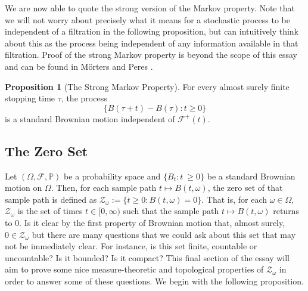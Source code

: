 \documentclass[a4paper,11pt]{article}
\theoremstyle{plain}
\theoremstyle{definition}
\newtheorem{definition}[theorem]{Definition}
\newtheorem{proposition}[theorem]{Proposition}
\begin{document}

We are now able to quote the strong version of the Markov property. Note that we will not worry about precisely what it means for a stochastic process to be independent of a filtration in the following proposition, but can intuitively think about this as the process being independent of any information available in that filtration. Proof of the strong Markov property is beyond the scope of this essay and can be found in M\"orters and Peres \citep[p.~43-44]{M&P}.

\begin{proposition}[The Strong Markov Property]\citep[p.~43]{M&P}
For every almost surely finite stopping time $\tau$, the process
\[
\{B(\tau + t) - B(\tau): t \geq 0\}
\]
is a standard Brownian motion independent of $\mathcal{F}^+(t)$.
\end{proposition}

\subsection{The Zero Set}

Let $(\Omega,\mathcal{F},\mathbb{P})$ be a probability space and $\{B_t:t\ \geq 0\}$ be a standard Brownian motion on $\Omega$. Then, for each sample path $t \mapsto B(t,\omega)$, the zero set of that sample path is defined as $\mathcal{Z}_\omega := \{t \geq 0:B(t,\omega) = 0\}$. That is, for each $\omega \in \Omega$, $\mathcal{Z}_\omega$ is the set of times $t \in [0,\infty)$ such that the sample path $t \mapsto B(t,\omega)$ returns to $0$. Is it clear by the first property of Brownian motion that, almost surely, $0 \in \mathcal{Z}_\omega$ but there are many questions that we could ask about this set that may not be immediately clear. For instance, is this set finite, countable or uncountable? Is it bounded? Is it compact? This final section of the essay will aim to prove some nice measure-theoretic and topological properties of $\mathcal{Z}_\omega$ in order to answer some of these questions. We begin with the following proposition.
\end{document}
